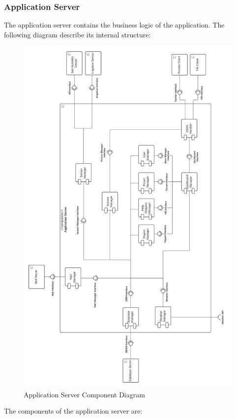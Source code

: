 \documentclass[10pt]{article} %
\begin{document}
\subsubsection{Application Server}
The application server contains the business logic of the application. The following diagram describe its internal structure:
\begin{figure}[t!]
    \centering 
    \includegraphics[scale=0.415]{images/app_server_component.png}
    \caption{Application Server Component Diagram}
    \label{fig:app_component}
\end{figure}
The components of the application server are:
\end{document}

